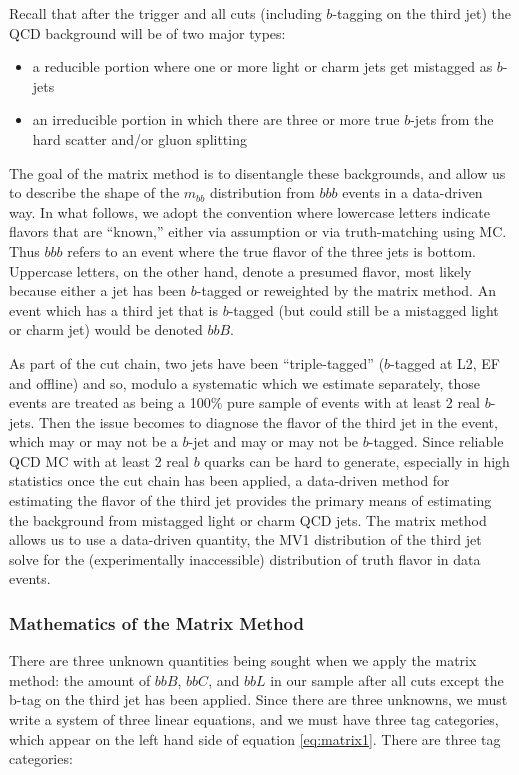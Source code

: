 Recall that after the trigger and all cuts (including $b$-tagging on the third jet) the QCD background will be of two major types:

\begin{itemize}
    \item a reducible portion where one or more light or charm jets get mistagged as $b$-jets
    \item an irreducible portion in which there are three or more true $b$-jets from the
hard scatter and/or gluon splitting
\end{itemize}


The goal of the matrix method is to disentangle these backgrounds, and allow us to describe the shape of the $m_{bb}$ distribution from $bbb$ events
in a data-driven way.  In what follows, we adopt the convention where lowercase letters indicate flavors
that are ``known,'' either via assumption or via truth-matching using MC.  Thus $bbb$ refers to an event where the true flavor of the three jets is bottom.  Uppercase letters,
on the other hand, denote a presumed flavor, most likely because either a jet has been $b$-tagged or reweighted by the matrix method.  An event which has a third jet
that is $b$-tagged (but could still be a mistagged light or charm jet) would be
denoted $bbB$.  

As part of the cut chain, two jets have been ``triple-tagged'' ($b$-tagged
at L2, EF and offline) and so, modulo a systematic which we estimate separately, 
those events are treated as being a 100\% pure sample of events with at least 2 real $b$-jets.
Then the issue becomes to diagnose the flavor of the third jet in the event,
which may or may not be a $b$-jet and may or may not be $b$-tagged.  Since
reliable QCD MC with at least 2 real $b$ quarks can be hard to generate, especially
in high statistics once the cut chain has been applied, a data-driven method for
estimating the flavor of the third jet provides the primary means of estimating
the background from mistagged light or charm QCD jets.  The matrix method allows
us to use a data-driven quantity, the MV1 distribution of the third jet
solve for the (experimentally inaccessible) distribution of truth flavor in data events.

\subsubsection{Mathematics of the Matrix Method}
There are three unknown quantities being sought when we apply the matrix method: the amount of $bbB$, $bbC$, and $bbL$ in our sample after all cuts except the b-tag on the third jet has been applied.   Since there are three unknowns, we must write a system of three linear equations, and we must have three tag categories, which appear on the left hand side of equation \ref{eq:matrix1}.  There are three tag categories:
	
